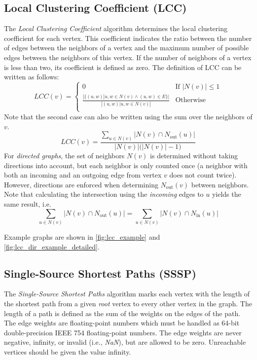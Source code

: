 \subsection{Local Clustering Coefficient (LCC)}
\label{sec:lcc}
The \emph{Local Clustering Coefficient} algorithm determines the local clustering coefficient for each vertex. This coefficient indicates the ratio between the number of edges between the neighbors of a vertex and the maximum number of possible edges between the neighbors of this vertex. If the number of neighbors of a vertex is less than two, its coefficient is defined as zero. The definition of LCC can be written as follows:
%
\begin{equation}
LCC(v) = \begin{cases}
0 & \text{If } |N(v)| \leq 1 \\
\frac{|\{(u, w) | u, w \in N(v) \wedge (u, w) \in E\}|}
{|{(u,w) | u, w \in N(v)}|} & \text{Otherwise} \\
\end{cases}
\end{equation}
%
Note that the second case can also be written using the sum over the neighbors of $v$.
%
\begin{equation}
LCC(v) = \frac{\sum_{u \in N(v)} |N(v) \cap N_\mathrm{out}(u)|}{|N(v)| \big( |N(v)| - 1 \big)}
\end{equation}
%
For \emph{directed graphs}, the set of neighbors $N(v)$ is determined without taking directions into account, but each neighbor is only counted once (a neighbor with both an incoming and an outgoing edge from vertex $v$ does not count twice).
However, directions are enforced when determining $N_\mathrm{out}(v)$ between neighbors. Note that calculating the intersection using the \emph{incoming} edges to $u$ yields the same result, i.e.\
\begin{equation}
	\sum_{u \in N(v)} |N(v) \cap N_\mathrm{out}(u)| = 
	\sum_{u \in N(v)} |N(v) \cap N_\mathrm{in}(u)|
\end{equation}

Example graphs are shown in \autoref{fig:lcc_example} and \autoref{fig:lcc_dir_example_detailed}.

\subsection{Single-Source Shortest Paths (SSSP)}
\label{sec:sssp}
The \emph{Single-Source Shortest Paths} algorithm marks each vertex with the length of the shortest path from a given \emph{root} vertex to every other vertex in the graph. The length of a path is defined as the sum of the weights on the edges of the path. The edge weights are floating-point numbers which must be handled as 64-bit double-precision IEEE 754 floating-point numbers. The edge weights are never negative, infinity, or invalid (i.e., \emph{NaN}), but are allowed to be zero. Unreachable vertices should be given the value infinity.

